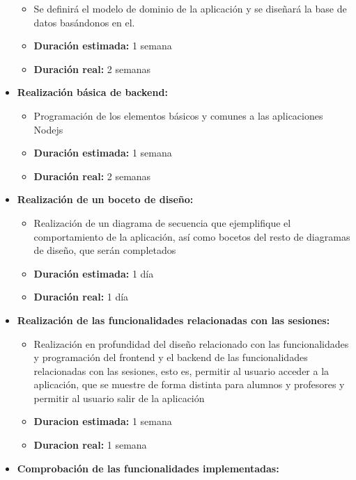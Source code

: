 \documentclass[openright,twoside,10pt]{book}
\providecommand{\tightlist}{%
  \setlength{\itemsep}{0pt}\setlength{\parskip}{0pt}}
\begin{document}
\begin{itemize}
      \begin{itemize}
      \tightlist
      \item
        Se definirá el modelo de dominio de la aplicación y se diseñará la
        base de datos basándonos en el.
      \item
        \textbf{Duración estimada:} 1 semana
      \item
        \textbf{Duración real:} 2 semanas
      \end{itemize}
    \item
      \textbf{Realización básica de backend:}
    
      \begin{itemize}
      \tightlist
      \item
        Programación de los elementos básicos y comunes a las aplicaciones
        Nodejs
      \item
        \textbf{Duración estimada:} 1 semana
      \item
        \textbf{Duración real:} 2 semanas
      \end{itemize}
    \item
      \textbf{Realización de un boceto de diseño:}
    
      \begin{itemize}
      \tightlist
      \item
        Realización de un diagrama de secuencia que ejemplifique el
        comportamiento de la aplicación, así como bocetos del resto de
        diagramas de diseño, que serán completados
      \item
        \textbf{Duración estimada:} 1 día
      \item
        \textbf{Duración real:} 1 día
      \end{itemize}
    \item
      \textbf{Realización de las funcionalidades relacionadas con las
      sesiones:}
    
      \begin{itemize}
      \tightlist
      \item
        Realización en profundidad del diseño relacionado con las
        funcionalidades y programación del frontend y el backend de las
        funcionalidades relacionadas con las sesiones, esto es, permitir al
        usuario acceder a la aplicación, que se muestre de forma distinta
        para alumnos y profesores y permitir al usuario salir de la
        aplicación
      \item
        \textbf{Duracion estimada:} 1 semana
      \item
        \textbf{Duracion real:} 1 semana
      \end{itemize}
    \item
      \textbf{Comprobación de las funcionalidades implementadas:}
    

\end{itemize}
\end{document}
